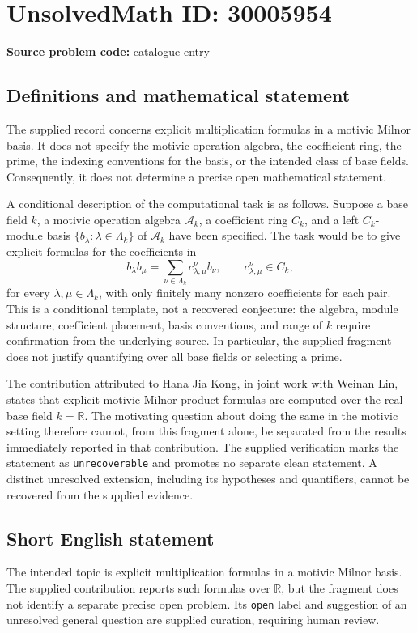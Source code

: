 \documentclass[11pt]{article}
\newcommand{\R}{\mathbb{R}}
\begin{document}
\section*{UnsolvedMath ID: 30005954}
\textbf{Source problem code:} catalogue entry
\subsection{Definitions and mathematical statement}
The supplied record concerns explicit multiplication formulas in a motivic Milnor basis. It does not specify the motivic operation algebra, the coefficient ring, the prime, the indexing conventions for the basis, or the intended class of base fields. Consequently, it does not determine a precise open mathematical statement.

A conditional description of the computational task is as follows. Suppose a base field \(k\), a motivic operation algebra \(\mathcal A_k\), a coefficient ring \(C_k\), and a left \(C_k\)-module basis \(\{b_\lambda:\lambda\in\Lambda_k\}\) of \(\mathcal A_k\) have been specified. The task would be to give explicit formulas for the coefficients in
\[
 b_\lambda b_\mu
 =\sum_{\nu\in\Lambda_k}c_{\lambda,\mu}^{\nu}b_\nu,
 \qquad c_{\lambda,\mu}^{\nu}\in C_k,
\]
for every \(\lambda,\mu\in\Lambda_k\), with only finitely many nonzero coefficients for each pair. This is a conditional template, not a recovered conjecture: the algebra, module structure, coefficient placement, basis conventions, and range of \(k\) require confirmation from the underlying source. In particular, the supplied fragment does not justify quantifying over all base fields or selecting a prime.

The contribution attributed to Hana Jia Kong, in joint work with Weinan Lin, states that explicit motivic Milnor product formulas are computed over the real base field \(k=\R\). The motivating question about doing the same in the motivic setting therefore cannot, from this fragment alone, be separated from the results immediately reported in that contribution. The supplied verification marks the statement as \texttt{unrecoverable} and promotes no separate clean statement. A distinct unresolved extension, including its hypotheses and quantifiers, cannot be recovered from the supplied evidence.
\subsection{Short English statement}
The intended topic is explicit multiplication formulas in a motivic Milnor basis. The supplied contribution reports such formulas over \(\R\), but the fragment does not identify a separate precise open problem. Its \texttt{open} label and suggestion of an unresolved general question are supplied curation, requiring human review.
\end{document}
